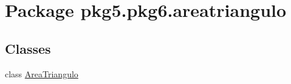 \hypertarget{namespacepkg5_1_1pkg6_1_1areatriangulo}{}\section{Package pkg5.\+pkg6.\+areatriangulo}
\label{namespacepkg5_1_1pkg6_1_1areatriangulo}
\subsection*{Classes}
\begin{DoxyCompactItemize}
\item 
class \mbox{\hyperlink{classpkg5_1_1pkg6_1_1areatriangulo_1_1_area_triangulo}{Area\+Triangulo}}
\end{DoxyCompactItemize}
